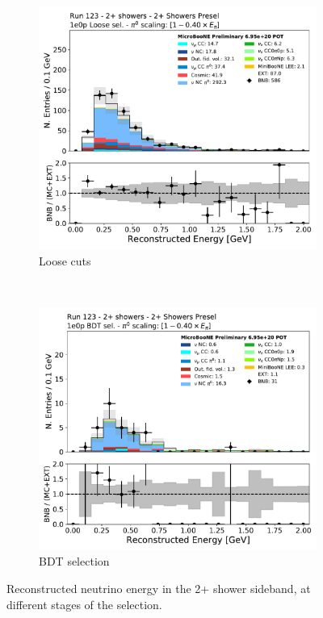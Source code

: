 \begin{figure}[H]
\begin{center}
    \begin{subfigure}{0.45\textwidth}
    \centering
    \includegraphics[width=1.00\textwidth]{Sidebands/Figures/TwoShr_1e0pSel_newSamples/reco_e_loose.pdf}
    \caption{\zpsel Loose cuts}
    \end{subfigure}\\[1ex]

    \begin{subfigure}{0.45\textwidth}
    \centering
    \includegraphics[width=1.00\textwidth]{Sidebands/Figures/TwoShr_1e0pSel_newSamples/reco_e_BDT.pdf}
    \caption{\zpsel BDT selection}
    \end{subfigure}
    \caption{\label{fig:sb:1eZp:twopshr:recoe} Reconstructed neutrino energy in the 2+ shower sideband, at different stages of the \zpsel selection.}
    \end{center}
\end{figure}

